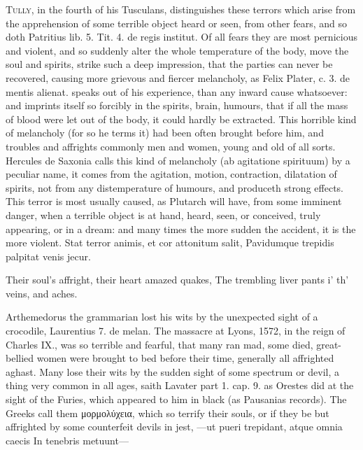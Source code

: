 {{\lettrine{T}{ully}, in the fourth of his Tusculans, distinguishes these terrors
which arise from the apprehension of some terrible object heard or
seen, from other fears, and so doth Patritius lib. 5. Tit. 4. de regis
institut. Of all fears they are most pernicious and violent, and so
suddenly alter the whole temperature of the body, move the soul and
spirits, strike such a deep impression, that the parties can never be
recovered, causing more grievous and fiercer melancholy, as Felix
Plater, c. 3. de mentis alienat. speaks out of his experience,
than any inward cause whatsoever: and imprints itself so forcibly in
the spirits, brain, humours, that if all the mass of blood were let out
of the body, it could hardly be extracted. This horrible kind of
melancholy (for so he terms it) had been often brought before him, and
troubles and affrights commonly men and women, young and old of all
sorts. Hercules de Saxonia calls this kind of melancholy (ab
agitatione spirituum) by a peculiar name, it comes from the agitation,
motion, contraction, dilatation of spirits, not from any distemperature
of humours, and produceth strong effects. This terror is most usually
caused, as Plutarch will have, from some imminent danger, when a
terrible object is at hand, heard, seen, or conceived, truly
appearing, or in a dream: and many times the more sudden the
accident, it is the more violent.
Stat terror animis, et cor attonitum salit,
Pavidumque trepidis palpitat venis jecur.

Their soul's affright, their heart amazed quakes,
The trembling liver pants i' th' veins, and aches.

Arthemedorus the grammarian lost his wits by the unexpected sight of a
crocodile, Laurentius 7. de melan. The massacre at Lyons, 1572,
in the reign of Charles IX., was so terrible and fearful, that many ran
mad, some died, great-bellied women were brought to bed before their
time, generally all affrighted aghast. Many lose their wits by
the sudden sight of some spectrum or devil, a thing very common in all
ages, saith Lavater part 1. cap. 9. as Orestes did at the sight of the
Furies, which appeared to him in black (as Pausanias records).
The Greeks call them \textgreek{μορμολύχεια}, which so terrify their souls, or if
they be but affrighted by some counterfeit devils in jest,
---ut pueri trepidant, atque omnia caecis
In tenebris metuunt---

}}
